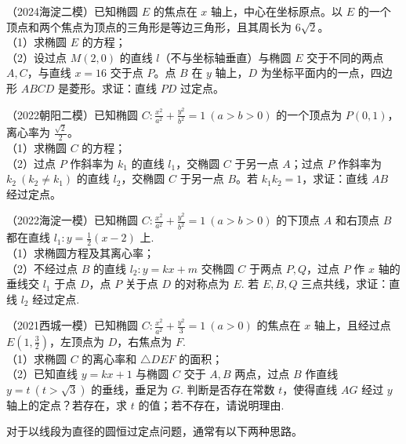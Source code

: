 \begin{example} %
（2024海淀二模）已知椭圆 $E$ 的焦点在 $x$ 轴上，中心在坐标原点。以 $E$ 的一个顶点和两个焦点为顶点的三角形是等边三角形，且其周长为 $6\sqrt{2}$。\\
（1）求椭圆 $E$ 的方程；\\
（2）设过点 $M(2,0)$ 的直线 $l$（不与坐标轴垂直）与椭圆 $E$ 交于不同的两点 $A,C$，与直线 $x=16$ 交于点 $P$。点 $B$ 在 $y$ 轴上，$D$ 为坐标平面内的一点，四边形 $ABCD$ 是菱形。求证：直线 $PD$ 过定点。
\end{example}
\begin{example} %
（2022朝阳二模）已知椭圆 $C:\frac{x^2}{a^2}+\frac{y^2}{b^2}=1\ (a>b>0)$ 的一个顶点为 $P(0,1)$，离心率为 $\frac{\sqrt{2}}{2}$。\\
（1）求椭圆 $C$ 的方程；\\
（2）过点 $P$ 作斜率为 $k_1$ 的直线 $l_1$，交椭圆 $C$ 于另一点 $A$；过点 $P$ 作斜率为 $k_2\ (k_2\neq k_1)$ 的直线 $l_2$，交椭圆 $C$ 于另一点 $B$。若 $k_1k_2=1$，求证：直线 $AB$ 经过定点。
\end{example}
\begin{example} %
（2022海淀一模）已知椭圆 $C:\frac{x^2}{a^2}+\frac{y^2}{b^2}=1\ (a>b>0)$ 的下顶点 $A$ 和右顶点 $B$ 都在直线 $l_1:y=\frac{1}{2}(x-2)$ 上.\\
（1）求椭圆方程及其离心率；\\
（2）不经过点 $B$ 的直线 $l_2:y=kx+m$ 交椭圆 $C$ 于两点 $P,Q$，过点 $P$ 作 $x$ 轴的垂线交 $l_1$ 于点 $D$，点 $P$ 关于点 $D$ 的对称点为 $E$. 若 $E,B,Q$ 三点共线，求证：直线 $l_2$ 经过定点.
\end{example}
\begin{example} %
（2021西城一模）已知椭圆 $C:\frac{x^2}{a^2}+\frac{y^2}{3}=1\ (a>0)$ 的焦点在 $x$ 轴上，且经过点 $E\left(1,\frac{3}{2}\right)$，左顶点为 $D$，右焦点为 $F$.\\
（1）求椭圆 $C$ 的离心率和 $\triangle DEF$ 的面积；\\
（2）已知直线 $y=kx+1$ 与椭圆 $C$ 交于 $A,B$ 两点，过点 $B$ 作直线 $y=t\ (t>\sqrt{3})$ 的垂线，垂足为 $G$. 判断是否存在常数 $t$，使得直线 $AG$ 经过 $y$ 轴上的定点？若存在，求 $t$ 的值；若不存在，请说明理由.
\end{example}


\medskip
{}

对于以线段为直径的圆恒过定点问题，通常有以下两种思路。

